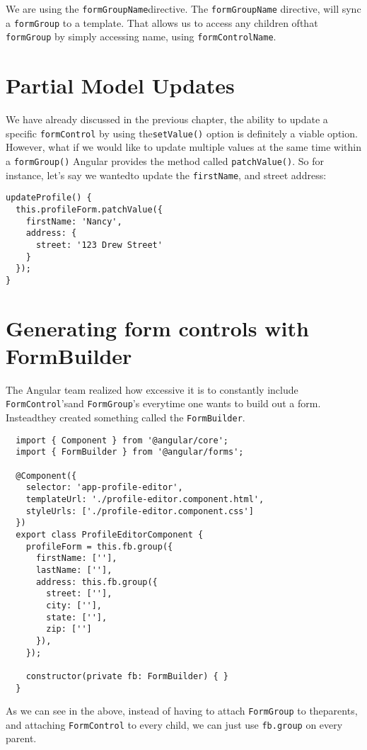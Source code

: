 We are using the \lstinline{formGroupName}directive. The \lstinline{formGroupName} directive, will sync a \lstinline{formGroup} to a template. That allows us to access any children ofthat \lstinline{formGroup} by simply accessing name, using \lstinline{formControlName}. 

\section{ Partial Model Updates }
We have already discussed in the previous chapter, the ability to update a specific \lstinline{formControl} by using the\lstinline{setValue()} option is definitely a viable option. However, what if we would like to update multiple values at the same time within a \lstinline{formGroup()} Angular provides the method called \lstinline{patchValue()}. So for instance, let's say we wantedto update the \lstinline{firstName}, and street address: 
\begin{lstlisting}
updateProfile() {
  this.profileForm.patchValue({
    firstName: 'Nancy',
    address: {
      street: '123 Drew Street'
    }
  });
}
\end{lstlisting}

\section{ Generating form controls with FormBuilder }
The Angular team realized how excessive it is to constantly include \lstinline{FormControl}'sand \lstinline{FormGroup}'s everytime one wants to build out a form. Insteadthey created something called the \lstinline{FormBuilder}. 
\begin{lstlisting}
  import { Component } from '@angular/core';
  import { FormBuilder } from '@angular/forms';
  
  @Component({
    selector: 'app-profile-editor',
    templateUrl: './profile-editor.component.html',
    styleUrls: ['./profile-editor.component.css']
  })
  export class ProfileEditorComponent {
    profileForm = this.fb.group({
      firstName: [''],
      lastName: [''],
      address: this.fb.group({
        street: [''],
        city: [''],
        state: [''],
        zip: ['']
      }),
    });
  
    constructor(private fb: FormBuilder) { }
  }  
\end{lstlisting}

As we can see in the above, instead of having to attach \lstinline{FormGroup} to theparents, and attaching \lstinline{FormControl} to every child, we can just use \lstinline{fb.group} on every parent.